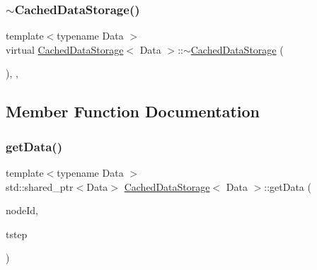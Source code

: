 \mbox{\label{class_cached_data_storage_abf458791ffb3e5c625ac373e6dc138e0}} 
\subsubsection{\texorpdfstring{$\sim$CachedDataStorage()}{~CachedDataStorage()}}
{\footnotesize\ttfamily template$<$typename Data $>$ \\
virtual \mbox{\hyperlink{class_cached_data_storage}{Cached\+Data\+Storage}}$<$ Data $>$\+::$\sim$\mbox{\hyperlink{class_cached_data_storage}{Cached\+Data\+Storage}} (\begin{DoxyParamCaption}{ }\end{DoxyParamCaption})\hspace{0.3cm}{\ttfamily [virtual]}, {\ttfamily [default]}, {\ttfamily [noexcept]}}



\subsection{Member Function Documentation}
\mbox{\label{class_cached_data_storage_aaea73b1bfa8a720e314e62e0bd4e268c}} 
\subsubsection{\texorpdfstring{getData()}{getData()}}
{\footnotesize\ttfamily template$<$typename Data $>$ \\
std\+::shared\+\_\+ptr$<$Data$>$ \mbox{\hyperlink{class_cached_data_storage}{Cached\+Data\+Storage}}$<$ Data $>$\+::get\+Data (\begin{DoxyParamCaption}\item[{\mbox{\hyperlink{classtypes_1_1_node_id}{types\+::\+Node\+Id}}}]{node\+Id,  }\item[{\mbox{\hyperlink{namespacetypes_a9dc53a5ce11a196d82a6983030de8028}{types\+::tstep\+\_\+t}}}]{tstep }\end{DoxyParamCaption})\hspace{0.3cm}{\ttfamily [inline]}}

